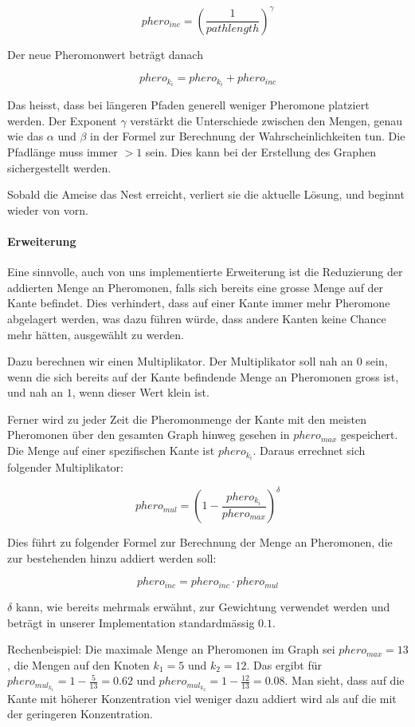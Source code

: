 \[ phero_{inc} = \left({\frac{1}{pathlength}}\right)^\gamma \]

\noindent
Der neue Pheromonwert beträgt danach 

\[ phero_{k_i} = phero_{k_i} + phero_{inc} \]

\noindent
Das heisst, dass bei längeren Pfaden generell weniger Pheromone platziert werden. Der Exponent $\gamma$ verstärkt die Unterschiede zwischen den Mengen, genau wie das $\alpha$ und $\beta$ in der Formel zur Berechnung der Wahrscheinlichkeiten tun. Die Pfadlänge muss immer $> 1$ sein. Dies kann bei der Erstellung des Graphen sichergestellt werden.

Sobald die Ameise das Nest erreicht, verliert sie die aktuelle Lösung, und beginnt wieder von vorn.

\paragraph*{Erweiterung}

Eine sinnvolle, auch von uns implementierte Erweiterung ist die Reduzierung der addierten Menge an Pheromonen, falls sich bereits eine grosse Menge auf der Kante befindet. Dies verhindert, dass auf einer Kante immer mehr Pheromone abgelagert werden, was dazu führen würde, dass andere Kanten keine Chance mehr hätten, ausgewählt zu werden.

Dazu berechnen wir einen Multiplikator. Der Multiplikator soll nah an $0$ sein, wenn die sich bereits auf der Kante befindende Menge an Pheromonen gross ist, und nah an $1$, wenn dieser Wert klein ist.

Ferner wird zu jeder Zeit die Pheromonmenge der Kante mit den meisten Pheromonen über den gesamten Graph hinweg gesehen in  $phero_{max}$ gespeichert. Die Menge auf einer spezifischen Kante ist $phero_{k_i}$. Daraus errechnet sich folgender Multiplikator:

\[ phero_{mul} = \left({ 1 - \frac{phero_{k_i}}{phero_{max}}}\right)^\delta \]

\noindent
Dies führt zu folgender Formel zur Berechnung der Menge an Pheromonen, die zur bestehenden hinzu addiert werden soll:

\[ phero_{inc} = phero_{inc} \cdot phero_{mul} \]

\noindent
$\delta$ kann, wie bereits mehrmals erwähnt, zur Gewichtung verwendet werden und beträgt in unserer Implementation standardmässig $0.1$.

Rechenbeispiel: Die maximale Menge an Pheromonen im Graph sei $phero_{max} = 13$, die Mengen auf den Knoten $k_1 = 5$ und $k_2 = 12$. Das ergibt für $phero_{mul_{k_1}} = 1 - \frac{5}{13} = 0.62$ und $phero_{mul_{k_2}} = 1 - \frac{12}{13} = 0.08$. Man sieht, dass auf die Kante mit höherer Konzentration viel weniger dazu addiert wird als auf die mit der geringeren Konzentration.

